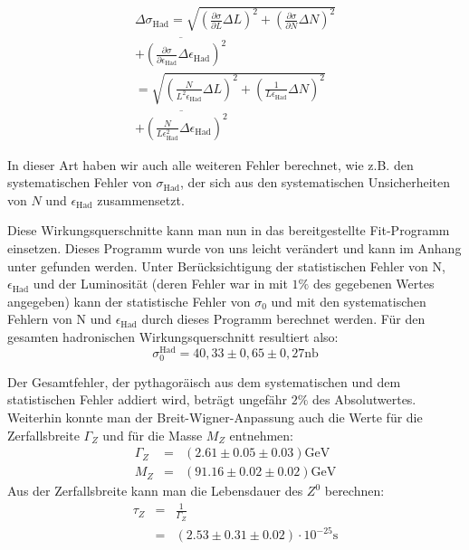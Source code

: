 \begin{equation}
  \begin{split}
    \Delta\sigma_\mathrm{Had} =  \sqrt{\left( \frac{\partial\sigma}{\partial L}\Delta L\right)^2 + \left( \frac{\partial\sigma}{\partial N}\Delta N\right)^2} \\
    \overline{+ \left( \frac{\partial\sigma}{\partial \epsilon_\mathrm{Had}}\Delta\epsilon_\mathrm{Had} \right)^2} \\
    = \sqrt{\left( \frac{N}{L^2\epsilon_\mathrm{Had}}\Delta L\right)^2 + \left( \frac{1}{L\epsilon_\mathrm{Had}}\Delta N\right)^2} \\
    \overline{+ \left( \frac{N}{L \epsilon_\mathrm{Had}^2}\Delta\epsilon_\mathrm{Had} \right)^2}
  \end{split}
\end{equation}

In dieser Art haben wir auch alle weiteren Fehler berechnet, wie z.B. den systematischen Fehler von $\sigma_\mathrm{Had}$, der sich aus den systematischen Unsicherheiten von $N$ und $\epsilon_{\mathrm{Had}}$ zusammensetzt.

Diese Wirkungsquerschnitte kann man nun in das bereitgestellte Fit-Programm einsetzen. Dieses Programm wurde von uns leicht verändert und kann im Anhang unter  gefunden werden. Unter Berücksichtigung der statistischen Fehler von N, $\epsilon_\mathrm{Had}$ und der Luminosität (deren Fehler war in \cite[S.9]{script} mit $1\%$ des gegebenen Wertes angegeben) kann der statistische Fehler von $\sigma_0$ und mit den systematischen Fehlern von N und $\epsilon_{\mathrm{Had}}$ durch dieses Programm berechnet werden. Für den gesamten hadronischen Wirkungsquerschnitt resultiert also:
\begin{equation}
\sigma_0^{\mathrm{Had}} = 40,33 \pm 0,65 \pm 0,27 \si{\nano\barn}
\end{equation}

Der Gesamtfehler, der pythagoräisch aus dem systematischen und dem statistischen Fehler addiert wird, beträgt ungefähr $2\%$ des Absolutwertes.\\
Weiterhin konnte man der Breit-Wigner-Anpassung auch die Werte für die Zerfallsbreite $\Gamma_Z$ und für die Masse $M_Z$ entnehmen:
\begin{eqnarray}
\Gamma_Z &=& (2.61 \pm 0.05 \pm 0.03)\si{\giga\electronvolt}\\
M_Z &=& (91.16 \pm 0.02 \pm 0.02)\si{\giga\electronvolt}
\end{eqnarray}
Aus der Zerfallsbreite kann man die Lebensdauer des $Z^0$ berechnen:
\begin{eqnarray}
\tau_Z &=& \frac{1}{\Gamma_Z}\\
&=& (2.53 \pm 0.31 \pm 0.02)\cdot 10^{-25}\si{\second}
\end{eqnarray}

